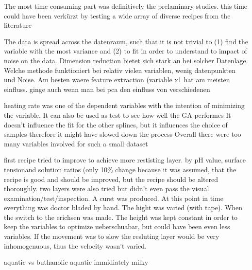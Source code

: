 \documentclass[a4paper]{article}
\begin{document}
The most time consuming part was definitively the prelaminary studies.
this time could have been verkürzt by testing a wide array of diverse recipes from the literature

The data is spread across the datenraum, such that it is not trivial to (1) find the variable with the most variance and (2) to fit in order to understand to impact of noise on the data. 
Dimension reduction bietet sich stark an bei solcher Datenlage. 
Welche methode funktioniert bei relativ vielen variablen, wenig datenpunkten und Noise. 
Am besten waere feature extraction (variable x1 hat am meisten einfluss. ginge auch wenn man bei pca den einfluss von verschiedenen 

heating rate was one of the dependent variables with the intention of minimizing the variable. 
It can also be used as test to see how well the GA performes
It doesn't influence the fit for the other splines, but it influences the choice of samples therefore it might have slowed down the process
Overall there were too many variables involved for such a small dataset

first recipe tried to improve to achieve more restisting layer. by pH value, surface 
tensionand solution ratios (only 10\% change because it was assumed, that the recipe is 
good and should be improved, but the recipe should be altered thoroughly.
two layers were also tried but didn't even pass the visual examination/test/inspection. 
A curst was produced. 
At this point in time everything was doctor bladed by hand. The hight was varied (with tape).
When the switch to the erichsen was made. The height was kept constant in order to keep 
the variables to optimize ueberschuabar, but could have been even less variables.
If the movement was to slow the resluting  layer would be very inhomogenuous, thus the
velocity wasn't varied.

aquatic vs buthanolic
aquatic immidiately milky
\end{document}
